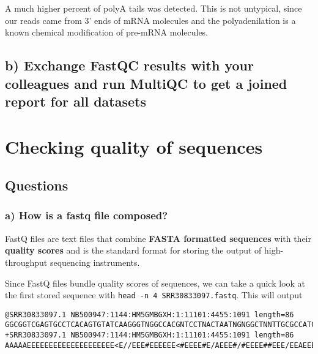 A much higher percent of polyA tails was detected. This is not
untypical, since our reads came from 3' ends of mRNA molecules and the
polyadenilation is a known chemical modification of pre-mRNA molecules.

\hypertarget{b-exchange-fastqc-results-with-your-colleagues-and-run-multiqc-to-get-a-joined-report-for-all-datasets}{%
\subsection{b) Exchange FastQC results with your colleagues and run
MultiQC to get a joined report for all
datasets}\label{b-exchange-fastqc-results-with-your-colleagues-and-run-multiqc-to-get-a-joined-report-for-all-datasets}}

\hypertarget{checking-quality-of-sequences}{%
\section{Checking quality of
sequences}\label{checking-quality-of-sequences}}

\hypertarget{questions}{%
\subsection{Questions}\label{questions}}

\hypertarget{a-how-is-a-fastq-file-composed}{%
\subsubsection{a) How is a fastq file
composed?}\label{a-how-is-a-fastq-file-composed}}

FastQ files are text files that combine \textbf{FASTA formatted
sequences} with their \textbf{quality scores} and is the standard format
for storing the output of high-throughput sequencing instruments.

Since FastQ files bundle quality scores of sequences, we can take a
quick look at the first stored sequence with
\texttt{head\ -n\ 4\ SRR30833097.fastq}. This will output

\begin{verbatim}
@SRR30833097.1 NB500947:1144:HM5GMBGXH:1:11101:4455:1091 length=86
GGCGGTCGAGTGCCTCACAGTGTATCAAGGGTNGGCCACGNTCCTNACTAATNGNGGCTNNTTGCGCCATCGTCTCANGCAATGTT
+SRR30833097.1 NB500947:1144:HM5GMBGXH:1:11101:4455:1091 length=86
AAAAAEEEEEEEEEEEEEEEEEEEE<E//EEE#EEEEEE<#EEEE#E/AEEE#/#EEEE##EEE/EEAEEEEAE6EE#/EEEAAEA
\end{verbatim}

